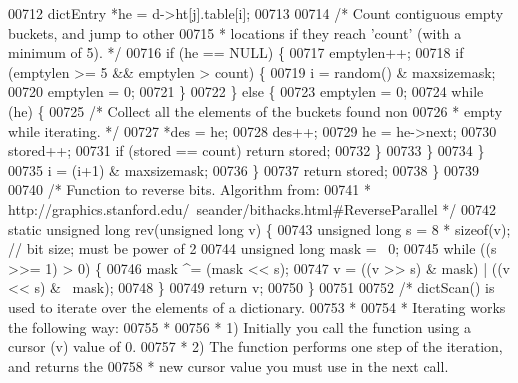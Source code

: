 \begin{DoxyCode}
00712             dictEntry *he = d->ht[j].table[i];
00713 
00714             \textcolor{comment}{/* Count contiguous empty buckets, and jump to other}
00715 \textcolor{comment}{             * locations if they reach 'count' (with a minimum of 5). */}
00716             \textcolor{keywordflow}{if} (he == NULL) \{
00717                 emptylen++;
00718                 \textcolor{keywordflow}{if} (emptylen >= 5 && emptylen > count) \{
00719                     i = random() & maxsizemask;
00720                     emptylen = 0;
00721                 \}
00722             \} \textcolor{keywordflow}{else} \{
00723                 emptylen = 0;
00724                 \textcolor{keywordflow}{while} (he) \{
00725                     \textcolor{comment}{/* Collect all the elements of the buckets found non}
00726 \textcolor{comment}{                     * empty while iterating. */}
00727                     *des = he;
00728                     des++;
00729                     he = he->next;
00730                     stored++;
00731                     \textcolor{keywordflow}{if} (stored == count) \textcolor{keywordflow}{return} stored;
00732                 \}
00733             \}
00734         \}
00735         i = (i+1) & maxsizemask;
00736     \}
00737     \textcolor{keywordflow}{return} stored;
00738 \}
00739 
00740 \textcolor{comment}{/* Function to reverse bits. Algorithm from:}
00741 \textcolor{comment}{ * http://graphics.stanford.edu/~seander/bithacks.html#ReverseParallel */}
00742 \textcolor{keyword}{static} \textcolor{keywordtype}{unsigned} \textcolor{keywordtype}{long} rev(\textcolor{keywordtype}{unsigned} \textcolor{keywordtype}{long} v) \{
00743     \textcolor{keywordtype}{unsigned} \textcolor{keywordtype}{long} s = 8 * \textcolor{keyword}{sizeof}(v); \textcolor{comment}{// bit size; must be power of 2}
00744     \textcolor{keywordtype}{unsigned} \textcolor{keywordtype}{long} mask = ~0;
00745     \textcolor{keywordflow}{while} ((s >>= 1) > 0) \{
00746         mask ^= (mask << s);
00747         v = ((v >> s) & mask) | ((v << s) & ~mask);
00748     \}
00749     \textcolor{keywordflow}{return} v;
00750 \}
00751 
00752 \textcolor{comment}{/* dictScan() is used to iterate over the elements of a dictionary.}
00753 \textcolor{comment}{ *}
00754 \textcolor{comment}{ * Iterating works the following way:}
00755 \textcolor{comment}{ *}
00756 \textcolor{comment}{ * 1) Initially you call the function using a cursor (v) value of 0.}
00757 \textcolor{comment}{ * 2) The function performs one step of the iteration, and returns the}
00758 \textcolor{comment}{ *    new cursor value you must use in the next call.}

\end{DoxyCode}
